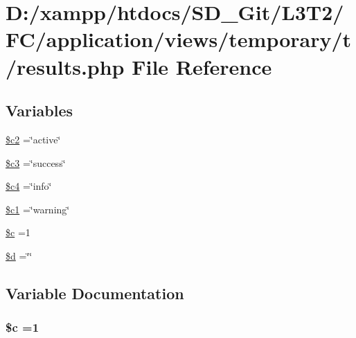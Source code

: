 \hypertarget{temporary_2t_2results_8php}{}\section{D\+:/xampp/htdocs/\+S\+D\+\_\+\+Git/\+L3\+T2/\+F\+C/application/views/temporary/t/results.php File Reference}
\label{temporary_2t_2results_8php}
\subsection*{Variables}
\begin{DoxyCompactItemize}
\item 
\hyperlink{temporary_2t_2results_8php_a7d0ce9eb4b126a1a12c7dade4f7ab7ef}{\$c2} =\char`\"{}active\char`\"{}
\item 
\hyperlink{temporary_2t_2results_8php_a78a28e488f33dbd56e562b07dc3862e3}{\$c3} =\char`\"{}success\char`\"{}
\item 
\hyperlink{temporary_2t_2results_8php_a480a6698b6eb8bfee885295be554a1e7}{\$c4} =\char`\"{}info\char`\"{}
\item 
\hyperlink{temporary_2t_2results_8php_ae8c2f379ac8fb393e500f127ae317cf0}{\$c1} =\char`\"{}warning\char`\"{}
\item 
\hyperlink{temporary_2t_2results_8php_ab73d7f4f2dae233dd561e7fdaab3a77b}{\$c} =1
\item 
\hyperlink{temporary_2t_2results_8php_a0cf5dd496d9f5ff1edf00d234771dcfe}{\$d} =\char`\"{}\char`\"{}
\end{DoxyCompactItemize}


\subsection{Variable Documentation}
\hypertarget{temporary_2t_2results_8php_ab73d7f4f2dae233dd561e7fdaab3a77b}{}
\subsubsection[{\$c}]{\setlength{\rightskip}{0pt plus 5cm}\${\bf c} =1}\label{temporary_2t_2results_8php_ab73d7f4f2dae233dd561e7fdaab3a77b}
\hypertarget{temporary_2t_2results_8php_ae8c2f379ac8fb393e500f127ae317cf0}{}
